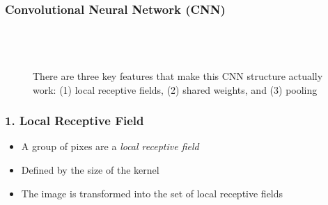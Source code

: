 \documentclass[xcolor={dvipsnames}]{beamer}
\begin{document}
\frame
{
 \frametitle{Convolutional Neural Network (CNN)}

\begin{figure}
\centering
{}\\${}$\\${}$\\

There are three key features that make this CNN structure actually work: (1) local receptive fields, (2) shared weights,
and (3) pooling

\end{figure}

}








\frame
{
 \frametitle{1. Local Receptive Field}

\begin{figure}
\centering
{}
\end{figure}

\begin{itemize}
\item A group of pixes are a \emph{local receptive field}
\item Defined by the size of the kernel 
\item The image is transformed into the set of local receptive fields
\end{itemize}

}
\end{document}
